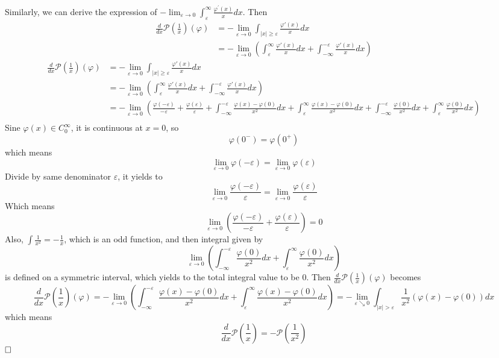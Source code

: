 \documentclass{article}
\newcommand{\qedhere}{$\hfill\ensuremath{\square}$}
\begin{document}
Similarly, we can derive the expression of $-\lim _{\varepsilon \rightarrow 0} \int_{\varepsilon}^{\infty} \frac{\varphi^{\prime}(x)}{x} d x$. Then
\begin{align*}
	\frac{d}{dx}\mathcal{P}\left(\frac{1}{x}\right)(\varphi)& = - \lim _{\varepsilon \rightarrow 0} \int_{|x| \geq \varepsilon} \frac{\varphi'(x)}{x} d x \\
	&= -\lim _{\varepsilon \rightarrow 0} (\int_{\varepsilon}^\infty \frac{\varphi'(x)}{x} d x + \int_{-\infty}^{-\varepsilon} \frac{\varphi'(x)}{x} d x)
\end{align*}
\begin{align*}
	\frac{d}{dx}\mathcal{P}\left(\frac{1}{x}\right)(\varphi)& = - \lim _{\varepsilon \rightarrow 0} \int_{|x| \geq \varepsilon} \frac{\varphi'(x)}{x} d x \\
	&= -\lim _{\varepsilon \rightarrow 0} (\int_{\varepsilon}^\infty \frac{\varphi'(x)}{x} d x + \int_{-\infty}^{-\varepsilon} \frac{\varphi'(x)}{x} d x)\\
	&=-\lim _{\varepsilon \rightarrow 0}\left( \frac{\varphi(-\varepsilon)}{-\varepsilon}+\frac{\varphi(\varepsilon)}{\varepsilon} + \int_{-\infty}^{-\varepsilon} \frac{\varphi(x)-\varphi(0)}{x^2} d x + \int_{\varepsilon}^{\infty} \frac{\varphi(x)-\varphi(0)}{x^{2}} d x+ \int_{-\infty}^{-\varepsilon} \frac{\varphi(0)}{x^2} d x +\int_{\varepsilon}^{\infty} \frac{\varphi(0)}{x^2} d x \right)\\
\end{align*}
Sine $\varphi(x) \in C_0^\infty$, it is continuous at $x = 0$, so 
\[
	\varphi(0^-) = \varphi(0^+)
\]	
which means
\[
	\lim _{\varepsilon \rightarrow 0} \varphi(-\varepsilon) =\lim _{\varepsilon \rightarrow 0}  \varphi(\varepsilon)
\]
Divide by same denominator $\varepsilon$, it yields to 
\[
	\lim _{\varepsilon \rightarrow 0} \frac{\varphi(-\varepsilon)}{\varepsilon} =\lim _{\varepsilon \rightarrow 0}  \frac{\varphi(\varepsilon)}{\varepsilon}
\]
Which means
\[
	\lim _{\varepsilon \rightarrow 0} \left(\frac{\varphi(-\varepsilon)}{-\varepsilon} + \frac{\varphi(\varepsilon)}{\varepsilon}\right) = 0
\]
Also, $\int \frac{1}{x^2} = -\frac{1}{x}$, which is an odd function, and then integral given by
\[
	\lim _{\varepsilon \rightarrow 0} \left( \int_{-\infty}^{-\varepsilon} \frac{\varphi(0)}{x^{2}} d x+\int_{\varepsilon}^{\infty} \frac{\varphi(0)}{x^{2}} d x \right)
\]
is defined on a symmetric interval, which yields to the total integral value to be 0. Then $\frac{d}{dx}\mathcal{P}\left(\frac{1}{x}\right)(\varphi)$ becomes
\[
	\frac{d}{dx}\mathcal{P}\left(\frac{1}{x}\right)(\varphi) = -\lim _{\varepsilon \rightarrow 0} \left(\int_{-\infty}^{-\varepsilon} \frac{\varphi(x)-\varphi(0)}{x^{2}} d x + \int_{\varepsilon}^{\infty} \frac{\varphi(x)-\varphi(0)}{x^{2}} d x \right) = -\lim _{\varepsilon \searrow 0} \int_{|x|>\varepsilon} \frac{1}{x^{2}}(\varphi(x)-\varphi(0)) d x
\]
which means
\[
	\frac{d}{d x} \mathcal{P}\left(\frac{1}{x}\right)=-\mathcal{P}\left(\frac{1}{x^{2}}\right)
\]
\qedhere
\end{document}
